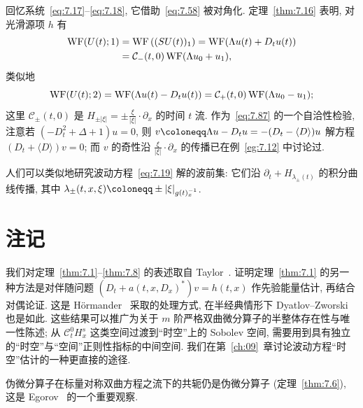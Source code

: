 \begin{example}\label{eg:7.17}
回忆系统~\eqref{eq:7.17}--\eqref{eq:7.18}, 它借助~\eqref{eq:7.58} 被对角化. 定理~\ref{thm:7.16} 表明, 对光滑源项 $h$ 有
\begin{equation}\label{eq:7.86}
    \begin{aligned}
        \operatorname{WF}(U(t); 1) &= \operatorname{WF}\left( (SU(t))_1 \right) = \operatorname{WF}(\Lambda u(t) + D_t u(t)) \\
        &= \mathcal{C}_-(t, 0)\operatorname{WF}(\Lambda u_0 + u_1),
    \end{aligned}
\end{equation}
类似地
\begin{equation}\label{eq:7.87}
    \operatorname{WF}(U(t); 2) = \operatorname{WF}(\Lambda u(t) - D_t u(t)) = \mathcal{C}_+(t, 0)\operatorname{WF}(\Lambda u_0 - u_1);
\end{equation}
这里 $\mathcal{C}_\pm(t, 0)$ 是 $H_{\pm|\xi|} = \pm \frac{\xi}{|\xi|} \cdot \partial_x$ 的时间 $t$ 流. 作为~\eqref{eq:7.87} 的一个自洽性检验, 注意若 $(-D_t^2 + \Delta + 1)u = 0$, 则 $v \defeq \Lambda u - D_t u = -(D_t - \langle D \rangle)u$ 解方程 $(D_t + \langle D \rangle)v = 0$; 而 $v$ 的奇性沿 $\frac{\xi}{|\xi|} \cdot \partial_x$ 的传播已在例~\ref{eg:7.12} 中讨论过.
\end{example}

人们可以类似地研究波动方程~\eqref{eq:7.19} 解的波前集: 它们沿 $\partial_t + H_{\lambda_\pm(t)}$ 的积分曲线传播, 其中 $\lambda_\pm(t, x, \xi) \defeq \pm | \xi |_{g(t)_x^{-1}}$.



\section*{注记}

我们对定理~\ref{thm:7.1}--\ref{thm:7.8} 的表述取自 Taylor~\cite[§§7.7--7.8]{Tay11b}. 证明定理~\ref{thm:7.1} 的另一种方法是对伴随问题 $(D_t + a(t, x, D_x)^*)v = h(t, x)$ 作先验能量估计, 再结合对偶论证. 这是 Hörmander~\cite[Chapter XXIII]{Hor07} 采取的处理方式, 在半经典情形下 Dyatlov--Zworski~\cite[Appendix E.5]{DZ19} 也是如此. 这些结果可以推广为关于 $m$ 阶严格双曲微分算子的半整体存在性与唯一性陈述; 从 $\mathcal{C}^0_t H^s_x$ 这类空间过渡到``时空''上的 Sobolev 空间, 需要用到具有独立的``时空''与``空间''正则性指标的中间空间. 我们在第~\ref{ch:09}~章讨论波动方程``时空''估计的一种更直接的途径.

伪微分算子在标量对称双曲方程之流下的共轭仍是伪微分算子 (定理~\ref{thm:7.6}), 这是 Egorov~\cite{Ego69} 的一个重要观察.

